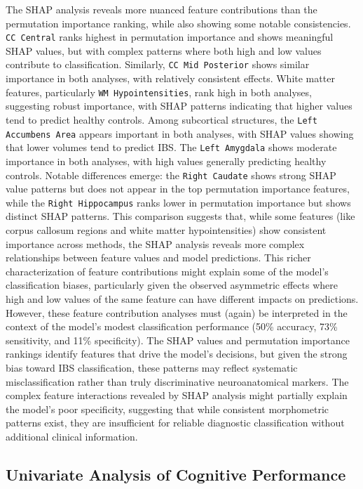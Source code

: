 \documentclass[diagnostics,article,accept,pdftex,moreauthors]{Definitions/mdpi}
\begin{document}
The SHAP analysis reveals more nuanced feature contributions than the permutation importance ranking, while also showing some notable consistencies. \texttt{CC Central} ranks highest in permutation importance and shows meaningful SHAP values, but with complex patterns where both high and low values contribute to classification. Similarly, \texttt{CC Mid Posterior} shows similar importance in both analyses, with relatively consistent effects. White matter features, particularly \texttt{WM Hypointensities}, rank high in both analyses, suggesting robust importance, with SHAP patterns indicating that higher values tend to predict healthy controls. Among subcortical structures, the \texttt{Left Accumbens Area} appears important in both analyses, with SHAP values showing that lower volumes tend to predict IBS. The \texttt{Left Amygdala} shows moderate importance in both analyses, with high values generally predicting healthy controls. Notable differences emerge: the \texttt{Right Caudate} shows strong SHAP value patterns but does not appear in the top permutation importance features, while the \texttt{Right Hippocampus} ranks lower in permutation importance but shows distinct SHAP patterns. This comparison suggests that, while some features (like corpus callosum regions and white matter hypointensities) show consistent importance across methods, the SHAP analysis reveals more complex relationships between feature values and model predictions. This richer characterization of feature contributions might explain some of the model's classification biases, particularly given the observed asymmetric effects where high and low values of the same feature can have different impacts on predictions. However, these feature contribution analyses must (again) be interpreted in the context of the model's modest classification performance (50\% accuracy, 73\% sensitivity, and 11\% specificity). The SHAP values and permutation importance rankings identify features that drive the model's decisions, but given the strong bias toward IBS classification, these patterns may reflect systematic misclassification rather than truly discriminative neuroanatomical markers. The complex feature interactions revealed by SHAP analysis might partially explain the model's poor specificity, suggesting that while consistent morphometric patterns exist, they are insufficient for reliable diagnostic classification without additional clinical information.


\subsection{Univariate Analysis of Cognitive Performance}
\end{document}
